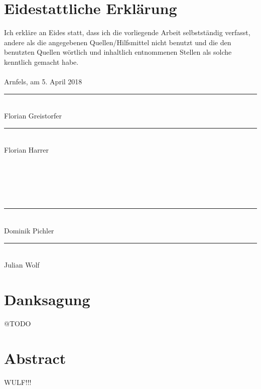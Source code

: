 \frontmatter
{}
\addtocounter{page}{2}

\newcommand{\doublesignature}[1]{%
  \parbox{\textwidth}{
    \hfill
    \parbox{7cm}{
      \centering
      \rule{6cm}{1pt}\\
      Florian Greistorfer
    }
    \parbox{7cm}{
      \centering
      \rule{6cm}{1pt}\\
      Florian Harrer
    }
  }
}
\newcommand{\doublesign}[1]{%
\mbox{}\\
\mbox{}\\
\mbox{}\\
\mbox{}\\
  \parbox{\textwidth}{
    \hfill
    \parbox{7cm}{
      \centering
      \rule{6cm}{1pt}\\
      Dominik Pichler
    }
    \parbox{7cm}{
      \centering
      \rule{6cm}{1pt}\\
      Julian Wolf
    }
  }
}

\vspace*{20pt}

\section*{Eidestattliche Erklärung}
\label{sec:eidestattliche-erklaerung}
Ich erkläre an Eides statt, dass ich die vorliegende Arbeit selbstständig verfasst, andere als die angegebenen
Quellen/Hilfsmittel nicht benutzt und die den benutzten Quellen wörtlich und inhaltlich entnommenen
Stellen als solche kenntlich gemacht habe.\\
\\
Arnfels, am 5. April 2018\\

\vskip 1cm

\doublesignature{}
\doublesign{}

\vskip 5cm

\clearpage

\newpage
\thispagestyle{empty}
\mbox{}

\clearpage

\section*{Danksagung}
\label{sec:danksagung}
@TODO

\clearpage

\newpage
\thispagestyle{empty}
\mbox{}

\clearpage

\section*{Abstract}
\label{sec:abstract}
WULF!!!

